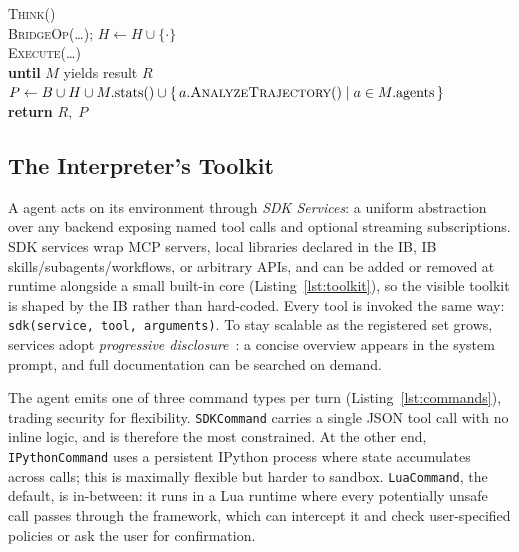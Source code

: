 \begin{algorithm}[t]
\begin{tabbing}
 \> \> \> \textsc{Think}()  \\
 \> \> \> \textsc{BridgeOp}(\ldots);\; $H \gets H \cup \{\cdot\}$  \\
 \> \> \> \textsc{Execute}(\ldots)  \\
 \> \> \textbf{until} $M$ yields result $R$ \\
 \> \> $P \gets B \cup H \cup M.\mathrm{stats}() \cup \{\, a.\textsc{AnalyzeTrajectory}() \mid a \in M.\mathrm{agents} \,\}$ \\
 \> \> \textbf{return} $R,\; P$ \\
\end{tabbing}
\end{algorithm}

\subsection{The Interpreter's Toolkit}
\label{sec:toolkit}

A \sysname agent acts on its environment through \emph{SDK Services}: a uniform abstraction over any backend exposing named tool calls and optional streaming subscriptions. SDK services wrap MCP servers, local libraries declared in the IB, IB skills/subagents/workflows, or arbitrary APIs, and can be added or removed at runtime alongside a small built-in core (Listing~\ref{lst:toolkit}), so the visible toolkit is shaped by the IB rather than hard-coded. Every tool is invoked the same way: \texttt{sdk(service, tool, arguments)}. To stay scalable as the registered set grows, services adopt \emph{progressive disclosure}~\cite{fielding2017rest,agentskills2026}: a concise overview appears in the system prompt, and full documentation can be searched on demand.

The agent emits one of three command types per turn (Listing~\ref{lst:commands}), trading security for flexibility. \texttt{SDKCommand} carries a single JSON tool call with no inline logic, and is therefore the most constrained. At the other end, \texttt{IPythonCommand} uses a persistent IPython process where state accumulates across calls; this is maximally flexible but harder to sandbox. \texttt{LuaCommand}, the default, is in-between: it runs in a Lua runtime where every potentially unsafe call passes through the framework, which can intercept it and check user-specified policies or ask the user for confirmation.

